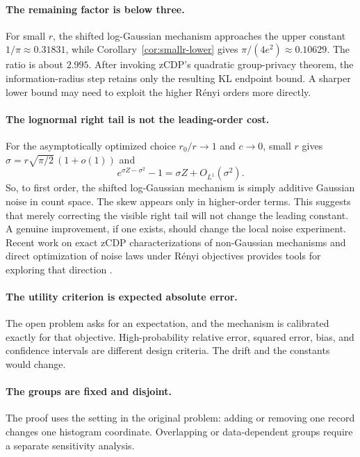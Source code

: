\documentclass[11pt]{article}
\theoremstyle{definition}
\begin{document}
\paragraph{The remaining factor is below three.}
For small $r$, the shifted log-Gaussian mechanism approaches the upper constant $1/\pi\approx0.31831$, while Corollary~\ref{cor:smallr-lower} gives $\pi/(4e^2)\approx0.10629$. The ratio is about $2.995$. After invoking zCDP's quadratic group-privacy theorem, the information-radius step retains only the resulting KL endpoint bound. A sharper lower bound may need to exploit the higher R\'enyi orders more directly.

\paragraph{The lognormal right tail is not the leading-order cost.}
For the asymptotically optimized choice $r_0/r\to1$ and $c\to0$, small $r$ gives $\sigma=r\sqrt{\pi/2}\,(1+o(1))$ and
\[
  e^{\sigma Z-\sigma^2}-1
  =\sigma Z+O_{L^1}(\sigma^2).
\]
So, to first order, the shifted log-Gaussian mechanism is simply additive Gaussian noise in count space. The skew appears only in higher-order terms. This suggests that merely correcting the visible right tail will not change the leading constant. A genuine improvement, if one exists, should change the local noise experiment. Recent work on exact zCDP characterizations of non-Gaussian mechanisms and direct optimization of noise laws under R\'enyi objectives provides tools for exploring that direction \citep{HarrisonManurangsi2025,GilaniEtAl2025}.

\paragraph{The utility criterion is expected absolute error.}
The open problem asks for an expectation, and the mechanism is calibrated exactly for that objective. High-probability relative error, squared error, bias, and confidence intervals are different design criteria. The drift and the constants would change.

\paragraph{The groups are fixed and disjoint.}
The proof uses the setting in the original problem: adding or removing one record changes one histogram coordinate. Overlapping or data-dependent groups require a separate sensitivity analysis.
\end{document}
